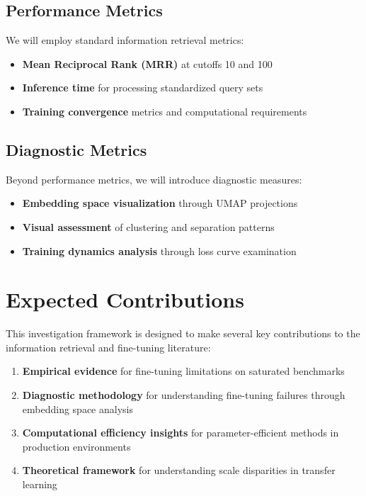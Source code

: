 \subsection{Performance Metrics}

We will employ standard information retrieval metrics:

\begin{itemize}
\item \textbf{Mean Reciprocal Rank (MRR)} at cutoffs 10 and 100
\item \textbf{Inference time} for processing standardized query sets
\item \textbf{Training convergence} metrics and computational requirements
\end{itemize}

\subsection{Diagnostic Metrics}

Beyond performance metrics, we will introduce diagnostic measures:

\begin{itemize}
\item \textbf{Embedding space visualization} through UMAP projections
\item \textbf{Visual assessment} of clustering and separation patterns
\item \textbf{Training dynamics analysis} through loss curve examination
\end{itemize}

\section{Expected Contributions}

This investigation framework is designed to make several key contributions to the information retrieval and fine-tuning literature:

\begin{enumerate}
\item \textbf{Empirical evidence} for fine-tuning limitations on saturated benchmarks
\item \textbf{Diagnostic methodology} for understanding fine-tuning failures through embedding space analysis
\item \textbf{Computational efficiency insights} for parameter-efficient methods in production environments
\item \textbf{Theoretical framework} for understanding scale disparities in transfer learning
\end{enumerate}

